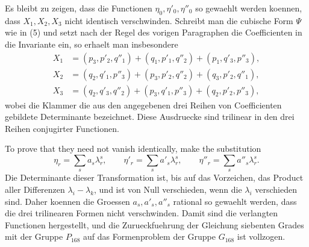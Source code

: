 \documentclass[11pt]{article}
\begin{document}
Es bleibt zu zeigen, dass die Functionen \(\eta_0,\eta'_0,\eta''_0\) so gewaehlt werden koennen, dass \(X_1,X_2,X_3\) nicht identisch verschwinden. Schreibt man die cubische Form \(\Psi\) wie in (5) und setzt nach der Regel des vorigen Paragraphen die Coefficienten in die Invariante ein, so erhaelt man insbesondere
\begin{equation}
\begin{aligned}
X_1&=(p_3,p'_2,q''_1)+(q_1,p'_1,q''_2)+(p_1,q'_3,p''_3),\\
X_2&=(q_2,q'_1,p''_3)+(p_3,p'_2,q''_2)+(q_3,p'_2,q''_1),\\
X_3&=(q_2,q'_3,q''_2)+(p_3,q'_1,p''_3)+(q_2,p'_2,p''_3),
\end{aligned}
\tag{1}
\end{equation}
wobei die Klammer die aus den angegebenen drei Reihen von Coefficienten gebildete Determinante bezeichnet. Diese Ausdruecke sind trilinear in den drei Reihen conjugirter Functionen.

To prove that they need not vanish identically, make the substitution
\begin{equation}
\eta_r=\sum_s a_s\lambda_r^s,
\qquad
\eta'_r=\sum_s a'_s\lambda_r^s,
\qquad
\eta''_r=\sum_s a''_s\lambda_r^s.
\tag{2}
\end{equation}
Die Determinante dieser Transformation ist, bis auf das Vorzeichen, das Product aller Differenzen \(\lambda_i-\lambda_k\), und ist von Null verschieden, wenn die \(\lambda_i\) verschieden sind. Daher koennen die Groessen \(a_s,a'_s,a''_s\) rational so gewaehlt werden, dass die drei trilinearen Formen nicht verschwinden. Damit sind die verlangten Functionen hergestellt, und die Zurueckfuehrung der Gleichung siebenten Grades mit der Gruppe \(P_{168}\) auf das Formenproblem der Gruppe \(G_{168}\) ist vollzogen.
\end{document}
